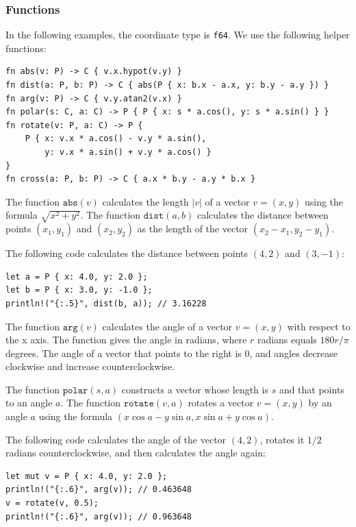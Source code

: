 \subsubsection*{Functions}

In the following examples, the coordinate type is
\texttt{f64}.
We use the following helper functions:

\begin{lstlisting}
fn abs(v: P) -> C { v.x.hypot(v.y) }
fn dist(a: P, b: P) -> C { abs(P { x: b.x - a.x, y: b.y - a.y }) }
fn arg(v: P) -> C { v.y.atan2(v.x) }
fn polar(s: C, a: C) -> P { P { x: s * a.cos(), y: s * a.sin() } }
fn rotate(v: P, a: C) -> P {
    P { x: v.x * a.cos() - v.y * a.sin(),
        y: v.x * a.sin() + v.y * a.cos() }
}
fn cross(a: P, b: P) -> C { a.x * b.y - a.y * b.x }
\end{lstlisting}

The function $\texttt{abs}(v)$ calculates the length
$|v|$ of a vector $v=(x,y)$
using the formula $\sqrt{x^2+y^2}$.
The function $\texttt{dist}(a,b)$
calculates the distance between points
$(x_1,y_1)$ and $(x_2,y_2)$
as the length of the vector $(x_2-x_1,y_2-y_1)$.

The following code calculates the distance
between points $(4,2)$ and $(3,-1)$:
\begin{lstlisting}
let a = P { x: 4.0, y: 2.0 };
let b = P { x: 3.0, y: -1.0 };
println!("{:.5}", dist(b, a)); // 3.16228
\end{lstlisting}

The function $\texttt{arg}(v)$ calculates the
angle of a vector $v=(x,y)$ with respect to the x axis.
The function gives the angle in radians,
where $r$ radians equals $180 r/\pi$ degrees.
The angle of a vector that points to the right is 0,
and angles decrease clockwise and increase
counterclockwise.

The function $\texttt{polar}(s,a)$ constructs a vector
whose length is $s$ and that points to an angle $a$.
The function $\texttt{rotate}(v,a)$ rotates a vector $v=(x,y)$
by an angle $a$ using the formula
$(x \cos a - y \sin a, x \sin a + y \cos a)$.

The following code calculates the angle of
the vector $(4,2)$, rotates it $1/2$ radians
counterclockwise, and then calculates the angle again:

\begin{lstlisting}
let mut v = P { x: 4.0, y: 2.0 };
println!("{:.6}", arg(v)); // 0.463648
v = rotate(v, 0.5);
println!("{:.6}", arg(v)); // 0.963648
\end{lstlisting}

